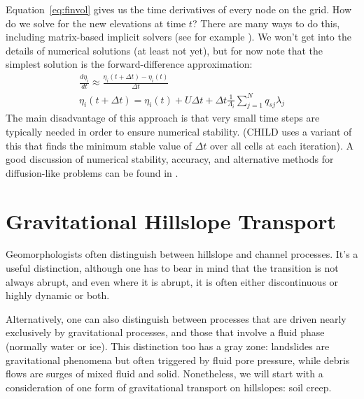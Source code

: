 \documentclass[12pt]{amsart}
\begin{document}
Equation~\ref{eq:finvol} gives us the time derivatives of every node on the grid. How do we solve for the new elevations at time $t$? There are many ways to do this, including matrix-based implicit solvers (see for example \citet{fagherazzi2002implicit}). We won't get into the details of numerical solutions (at least not yet), but for now note that the simplest solution is the forward-difference approximation:
\begin{eqnarray}
\frac{d\eta_i}{dt} \approx \frac{\eta_i(t+\Delta t) - \eta_i(t)}{\Delta t} \\
\eta_i(t+\Delta t) = \eta_i(t) + U\Delta t  + \Delta t \frac{1}{\Lambda_i} \sum_{j=1}^N q_{sj} \lambda_j
\end{eqnarray}
The main disadvantage of this approach is that very small time steps are typically needed in order to ensure numerical stability. (CHILD uses a variant of this that finds the minimum stable value of $\Delta t$ over all cells at each iteration). A good discussion of numerical stability, accuracy, and alternative methods for diffusion-like problems can be found in \citet{press2007numerical}.


\section{Gravitational Hillslope Transport}

Geomorphologists often distinguish between hillslope and channel processes. It's a useful distinction, although one has to bear in mind that the transition is not always abrupt, and even where it is abrupt, it is often either discontinuous or highly dynamic or both.

Alternatively, one can also distinguish between processes that are driven nearly exclusively by gravitational processes, and those that involve a fluid phase (normally water or ice). This distinction too has a gray zone: landslides are gravitational phenomena but often triggered by fluid pore pressure, while debris flows are surges of mixed fluid and solid. Nonetheless, we will start with a consideration of one form of gravitational transport on hillslopes: soil creep. 
\end{document}
